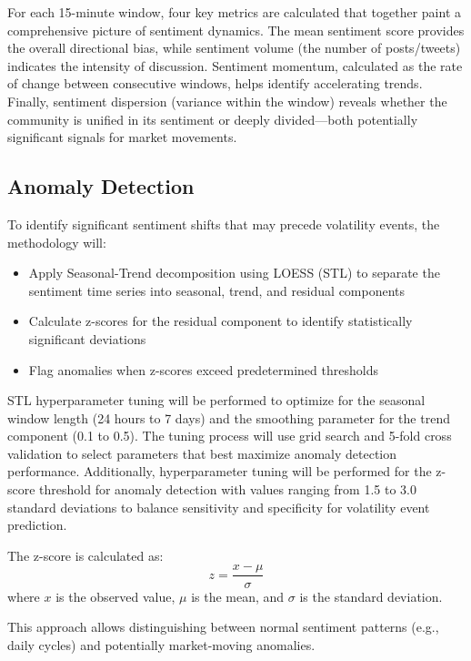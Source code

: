 \documentclass[11pt,twocolumn]{article}
\begin{document}
For each 15-minute window, four key metrics are calculated that together paint a comprehensive picture of sentiment dynamics. The mean sentiment score provides the overall directional bias, while sentiment volume (the number of posts/tweets) indicates the intensity of discussion. Sentiment momentum, calculated as the rate of change between consecutive windows, helps identify accelerating trends. Finally, sentiment dispersion (variance within the window) reveals whether the community is unified in its sentiment or deeply divided—both potentially significant signals for market movements.

\subsection{\textbf{Anomaly Detection}}
To identify significant sentiment shifts that may precede volatility events, the methodology will:
\begin{itemize}
\item Apply Seasonal-Trend decomposition using LOESS (STL) to separate the sentiment time series into seasonal, trend, and residual components
\item Calculate z-scores for the residual component to identify statistically significant deviations
\item Flag anomalies when z-scores exceed predetermined thresholds
\end{itemize}

STL hyperparameter tuning will be performed to optimize for the seasonal window length (24 hours to 7 days) and the smoothing parameter for the trend component (0.1 to 0.5). The tuning process will use grid search and 5-fold cross validation to select parameters that best maximize anomaly detection performance. Additionally, hyperparameter tuning will be performed for the z-score threshold for anomaly detection with values ranging from 1.5 to 3.0 standard deviations to balance sensitivity and specificity for volatility event prediction.

The z-score is calculated as:
\begin{equation}
z = \frac{x - \mu}{\sigma}
\end{equation}
where $x$ is the observed value, $\mu$ is the mean, and $\sigma$ is the standard deviation.

This approach allows distinguishing between normal sentiment patterns (e.g., daily cycles) and potentially market-moving anomalies.
\end{document}
